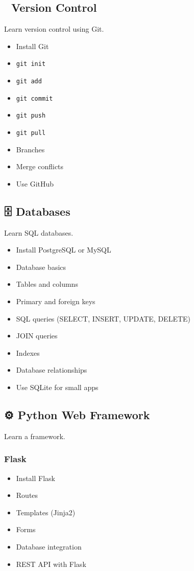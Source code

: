 \documentclass{article}
\begin{document}
\subsection*{🔧 Version Control}
Learn version control using Git.

\begin{itemize}[label=$\square$]
    \item Install Git
    \item \texttt{git init}
    \item \texttt{git add}
    \item \texttt{git commit}
    \item \texttt{git push}
    \item \texttt{git pull}
    \item Branches
    \item Merge conflicts
    \item Use GitHub
\end{itemize}

\subsection*{🗄️ Databases}
Learn SQL databases.

\begin{itemize}[label=$\square$]
    \item Install PostgreSQL or MySQL
    \item Database basics
    \item Tables and columns
    \item Primary and foreign keys
    \item SQL queries (SELECT, INSERT, UPDATE, DELETE)
    \item JOIN queries
    \item Indexes
    \item Database relationships
    \item Use SQLite for small apps
\end{itemize}

\subsection*{⚙️ Python Web Framework}
Learn a framework.

\subsubsection*{Flask}
\begin{itemize}[label=$\square$]
    \item Install Flask
    \item Routes
    \item Templates (Jinja2)
    \item Forms
    \item Database integration
    \item REST API with Flask
\end{itemize}
\end{document}
